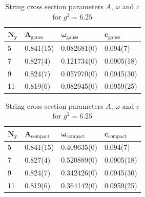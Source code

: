 \begin{table}[!hb]
\centering
\begin{tabular}{llll}
    $\mathbf{N_y}$ & $\mathbf{A_\mathrm{gauss}}$ & $\mathbf{\omega_\mathrm{gauss}}$ & $\mathbf{c_\mathrm{gauss}}$ \\ \hline
   5 & 0.841(15) & 0.082681(0) & 0.094(7) \\
   7 & 0.827(4) & 0.121734(0) & 0.0905(18) \\
   9 & 0.824(7) & 0.057970(0) & 0.0945(30) \\
   11 & 0.819(6) & 0.082945(0) & 0.0959(25) \\
\end{tabular}
\begin{tabular}{llll}
    $\mathbf{N_y}$ & $\mathbf{A_\mathrm{compact}}$ & $\mathbf{\omega_\mathrm{compact}}$ & $\mathbf{c_\mathrm{compact}}$ \\ \hline
   5 & 0.841(15) & 0.409635(0) & 0.094(7) \\
   7 & 0.827(4) & 0.520889(0) & 0.0905(18) \\
   9 & 0.824(7) & 0.342426(0) & 0.0945(30) \\
   11 & 0.819(6) & 0.364142(0) & 0.0959(25) \\
\end{tabular}
\caption{String cross section parameters $A$, $\omega$ and $c$ for $g^2=6.25$}
\end{table}
